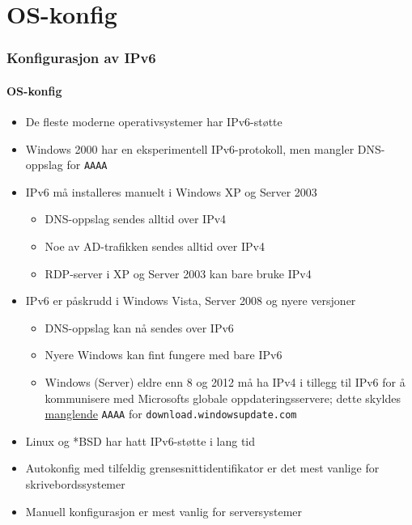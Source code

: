 \section{OS-konfig}
\begin{frame}%
  \frametitle{Konfigurasjon av IPv6}
  \framesubtitle{OS-konfig}
  \begin{itemize}%
  \item De fleste moderne operativsystemer har IPv6-støtte
  \item Windows 2000 har en eksperimentell IPv6-protokoll, men mangler
    DNS-oppslag for \texttt{AAAA}
  \item IPv6 må installeres manuelt i Windows XP og Server 2003
    \begin{itemize}%
    \item DNS-oppslag sendes alltid over \alert{IPv4}
    \item Noe av AD-trafikken sendes alltid over \alert{IPv4}
    \item RDP-server i XP og Server 2003 kan bare bruke \alert{IPv4}
    \end{itemize}
  \item IPv6 er påskrudd i Windows Vista, Server 2008 og nyere versjoner
    \begin{itemize}%
    \item DNS-oppslag kan nå sendes over IPv6
    \item Nyere Windows kan fint fungere med bare IPv6
    \item Windows (Server) eldre enn 8 og 2012 må ha \alert{IPv4} i
      tillegg til IPv6 for å kommunisere med Microsofts globale
      oppdateringsservere; dette skyldes
      \href{https://insinuator.net/2014/05/microsoft-windows-update-over-ipv6-or-not/}{manglende}
      \texttt{AAAA} for \texttt{download.windowsupdate.com}
    \end{itemize}
  \item Linux og *BSD har hatt IPv6-støtte i lang tid
  \item Autokonfig med tilfeldig grensesnittidentifikator er det mest
    vanlige for skrivebordssystemer
  \item Manuell konfigurasjon er mest vanlig for serversystemer
  \end{itemize}
\end{frame}


